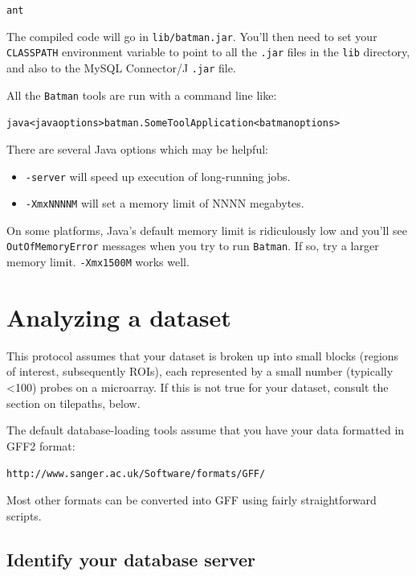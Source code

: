\documentclass[a4paper, 11pt]{article}
\newcommand{\bm}{{\tt Batman}\xspace}
\begin{document}
\begin{alltt}     ant\end{alltt}

The compiled code will go in {\tt lib/batman.jar}.  You'll then need to set your
{\tt CLASSPATH} environment variable to point to all the {\tt .jar} files in the
{\tt lib} directory, and also to the MySQL Connector/J {\tt .jar} file.

All the \bm tools are run with a command line like:

\begin{alltt}   java <java options> batman.SomeToolApplication <batman options>\end{alltt}

There are several Java options which may be helpful:

\begin{itemize}
\item{{\tt -server} will speed up execution of long-running jobs.}
\item{{\tt -XmxNNNNM} will set a memory limit of NNNN megabytes.}
\end{itemize}

On some platforms, Java's default memory limit is ridiculously low and you'll see
{\tt OutOfMemoryError} messages when you try to run \bm.  If so, try a larger
memory limit.  {\tt -Xmx1500M} works well.

\section{Analyzing a dataset}

This protocol assumes that your dataset is broken up into small blocks (regions of
interest, subsequently ROIs), each represented by a small number (typically <100)
probes on a microarray.  If this is not true for your dataset, consult the section
on tilepaths, below.

The default database-loading tools assume that you have your data formatted in
GFF2 format:

\begin{alltt}    http://www.sanger.ac.uk/Software/formats/GFF/\end{alltt}

Most other formats can be converted into GFF using fairly straightforward
scripts.

\subsection{Identify your database server}
\end{document}
